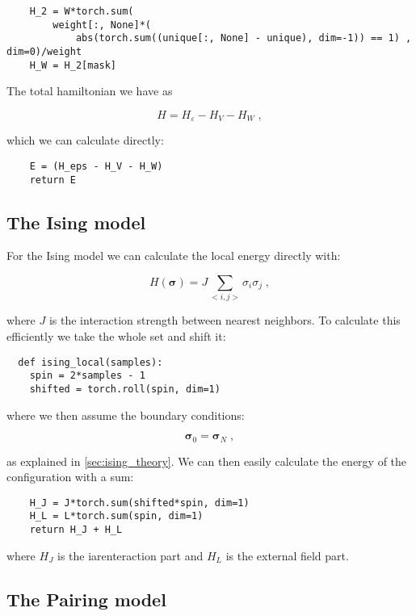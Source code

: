 \begin{verbatim} 
    H_2 = W*torch.sum(
        weight[:, None]*(
            abs(torch.sum((unique[:, None] - unique), dim=-1)) == 1) , dim=0)/weight
    H_W = H_2[mask]
\end{verbatim}

The total hamiltonian we have as

\[
  H = H_{\varepsilon} - H_V - H_W \; ,
\]

which we can calculate directly:

\begin{verbatim} 
    E = (H_eps - H_V - H_W)
    return E
\end{verbatim}


\subsection{The Ising model}

For the Ising model we can calculate the local energy directly with:

\begin{equation}
  H(\mathbf{\sigma}) = J\sum_{<i,j>}\sigma_i\sigma_j \; ,
  \label{eq:imp_hamil_ising}
\end{equation}

where $J$ is the interaction strength between nearest neighbors. To calculate this efficiently we take the whole set and shift it:

\begin{verbatim}
  def ising_local(samples):
    spin = 2*samples - 1
    shifted = torch.roll(spin, dim=1)
\end{verbatim}

where we then assume the boundary conditions:

\begin{equation}
  \mathbf{\sigma}_0 = \mathbf{\sigma}_N \; ,
  \label{eq:ising_boundary_imp}
\end{equation}

as explained in \ref{sec:ising_theory}. We can then easily calculate the energy of the configuration with a sum:

\begin{verbatim}
    H_J = J*torch.sum(shifted*spin, dim=1)
    H_L = L*torch.sum(spin, dim=1)
    return H_J + H_L
\end{verbatim}

where $H_J$ is the iarenteraction part and $H_L$ is the external field part.

\subsection{The Pairing model}


